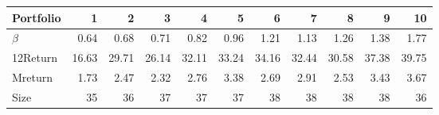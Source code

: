 \begin{tabular}{lrrrrrrrrrr}
	\toprule
	Portfolio & 1     & 2     & 3     & 4     & 5     & 6     & 7     & 8     & 9     & 10 \\
	\hline
	$ \beta $ & 0.64  & 0.68  & 0.71  & 0.82  & 0.96  & 1.21  & 1.13  & 1.26  & 1.38  & 1.77 \\
	12Return & 16.63 & 29.71 & 26.14 & 32.11 & 33.24 & 34.16 & 32.44 & 30.58 & 37.38 & 39.75 \\
	Mreturn & 1.73  & 2.47  & 2.32  & 2.76  & 3.38  & 2.69  & 2.91  & 2.53  & 3.43  & 3.67 \\
	Size  & 35    & 36    & 37    & 37    & 37    & 38    & 38    & 38    & 38    & 36 \\
	\bottomrule
	
	
\end{tabular}